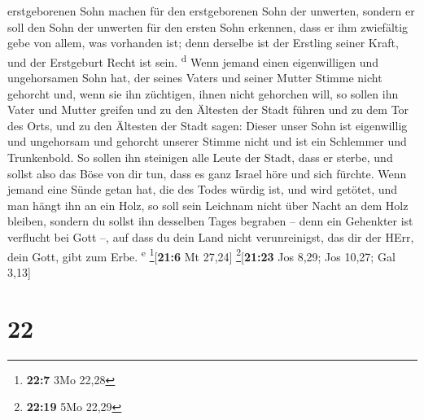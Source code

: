 erstgeborenen Sohn machen für den erstgeborenen Sohn der unwerten,
 sondern er soll den Sohn der unwerten für den ersten
Sohn erkennen, dass er ihm zwiefältig gebe von allem, was vorhanden ist;
denn derselbe ist der Erstling seiner Kraft, und der Erstgeburt Recht
ist sein. \textsuperscript{d}  Wenn jemand einen
eigenwilligen und ungehorsamen Sohn hat, der seines Vaters und seiner
Mutter Stimme nicht gehorcht und, wenn sie ihn züchtigen, ihnen nicht
gehorchen will,  so sollen ihn Vater und Mutter greifen
und zu den Ältesten der Stadt führen und zu dem Tor des Orts,
 und zu den Ältesten der Stadt sagen: Dieser unser Sohn
ist eigenwillig und ungehorsam und gehorcht unserer Stimme nicht und ist
ein Schlemmer und Trunkenbold.  So sollen ihn steinigen
alle Leute der Stadt, dass er sterbe, und sollst also das Böse von dir
tun, dass es ganz Israel höre und sich fürchte.  Wenn
jemand eine Sünde getan hat, die des Todes würdig ist, und wird getötet,
und man hängt ihn an ein Holz,  so soll sein Leichnam
nicht über Nacht an dem Holz bleiben, sondern du sollst ihn desselben
Tages begraben -- denn ein Gehenkter ist verflucht bei Gott --, auf dass
du dein Land nicht verunreinigst, das dir der HErr, dein Gott, gibt zum
Erbe. \textsuperscript{e} \footnote{\textbf{22:7} 3Mo 22,28}{[}\textbf{21:6}
Mt 27,24{]} \footnote{\textbf{22:19} 5Mo 22,29}{[}\textbf{21:23} Jos
8,29; Jos 10,27; Gal 3,13{]}

\hypertarget{section-21}{%
\section{22}\label{section-21}}

